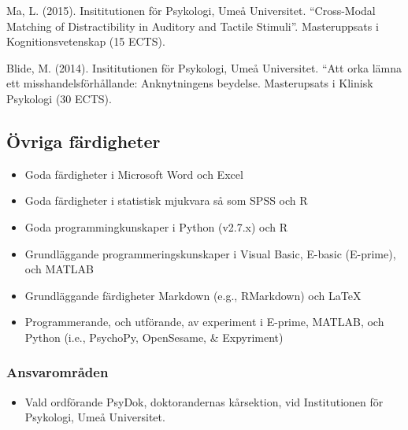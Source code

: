 \documentclass[]{article}
\providecommand{\tightlist}{%
  \setlength{\itemsep}{0pt}\setlength{\parskip}{0pt}}
\begin{document}
Ma, L. (2015). Insititutionen för Psykologi, Umeå Universitet.
``Cross-Modal Matching of Distractibility in Auditory and Tactile
Stimuli''. Masteruppsats i Kognitionsvetenskap (15 ECTS).

Blide, M. (2014). Insititutionen för Psykologi, Umeå Universitet. ``Att
orka lämna ett misshandelsförhållande: Anknytningens beydelse.
Masterupsats i Klinisk Psykologi (30 ECTS).

\subsection{Övriga färdigheter}\label{ovriga-fardigheter}

\begin{itemize}
\tightlist
\item
  Goda färdigheter i Microsoft Word och Excel
\item
  Goda färdigheter i statistisk mjukvara så som SPSS och R
\item
  Goda programmingkunskaper i Python (v2.7.x) och R
\item
  Grundläggande programmeringskunskaper i Visual Basic, E-basic
  (E-prime), och MATLAB
\item
  Grundläggande färdigheter Markdown (e.g., RMarkdown) och \LaTeX
\item
  Programmerande, och utförande, av experiment i E-prime, MATLAB, och
  Python (i.e., PsychoPy, OpenSesame, \& Expyriment)
\end{itemize}

\subsubsection{Ansvarområden}\label{ansvaromraden}

\begin{itemize}
\tightlist
\item
  Vald ordförande PsyDok, doktorandernas kårsektion, vid Institutionen
  för Psykologi, Umeå Universitet.
\end{itemize}
\end{document}

